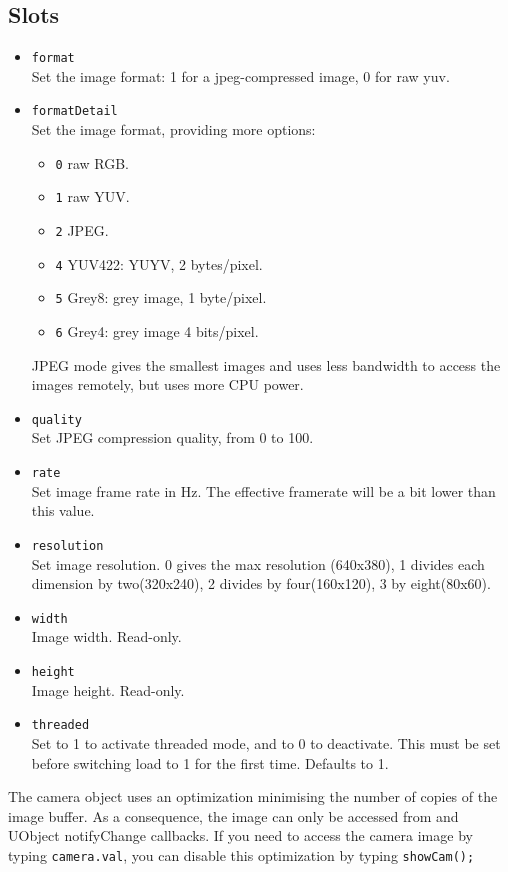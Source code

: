 \subsection{Slots}
\begin{itemize}
\item \lstinline|format| \\
  Set the image format: 1 for a jpeg-compressed image, 0 for raw yuv.
\item \lstinline|formatDetail| \\
  Set the image format, providing more options:
  \begin{itemize}
  \item \lstinline|0| raw RGB.
  \item \lstinline|1| raw YUV.
  \item \lstinline|2| JPEG.
  \item \lstinline|4| YUV422:  YUYV, 2 bytes/pixel.
  \item \lstinline|5| Grey8: grey image, 1 byte/pixel.
  \item \lstinline|6| Grey4: grey image 4 bits/pixel.
  \end{itemize}
  JPEG mode gives the smallest images and uses less bandwidth to access the
  images remotely, but uses more CPU power.
\item \lstinline|quality| \\
  Set JPEG compression quality, from 0 to 100.
\item \lstinline|rate| \\
  Set image frame rate in Hz. The effective framerate will be a bit lower than
  this value.
\item \lstinline|resolution| \\
  Set image resolution.  0 gives the max resolution (640x380), 1 divides each
  dimension by two(320x240), 2 divides by four(160x120), 3 by eight(80x60).
\item \lstinline|width| \\
  Image width. Read-only.
\item \lstinline|height| \\
  Image height. Read-only.
\item \lstinline|threaded| \\
  Set to 1 to activate threaded mode, and to 0 to deactivate. This must be set
  before switching load to 1 for the first time. Defaults to 1.
\end{itemize}

The camera object uses an optimization minimising the number of copies of the
image buffer. As a consequence, the image can only be accessed from \us and
UObject notifyChange callbacks. If you need to access the camera image by
typing \lstinline|camera.val|, you can disable this optimization by typing
\lstinline|showCam();|


